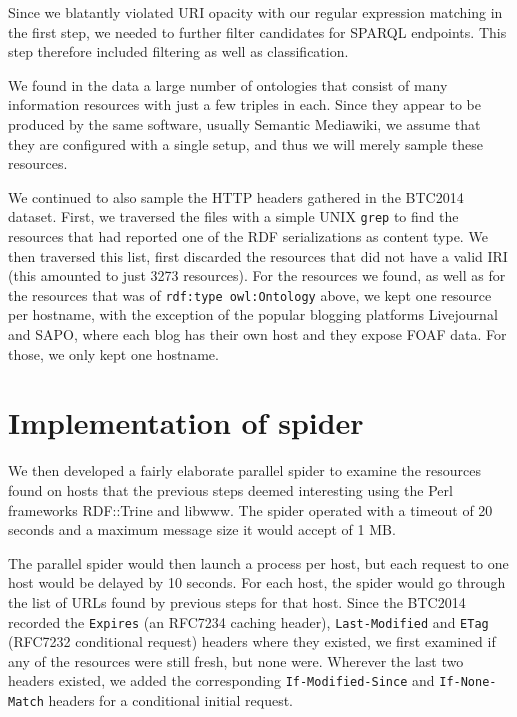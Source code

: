\documentclass{llncs}
\newcommand{\rdfterm}[1]{\texttt{#1}}
\newcommand{\httph}[1]{\texttt{#1}}
\begin{document}
\begin{subappendices}
Since we blatantly violated URI opacity with our regular expression
matching in the first step, we needed to further filter candidates for
SPARQL endpoints. This step therefore included filtering as well as
classification.

We found in the data a large number of ontologies that consist of many
information resources with just a few triples in each. Since they
appear to be produced by the same software, usually Semantic
Mediawiki, we assume that they are configured with a single setup, and
thus we will merely sample these resources.

We continued to also sample the HTTP headers gathered in the BTC2014
dataset. 
First, we traversed the files with a simple UNIX \texttt{grep} to find
the resources that had reported one of the RDF serializations as
content type. We then traversed this list, first discarded the
resources that did not have a valid IRI (this amounted to just 3273
resources). For the resources we found, as well as for the resources
that was of \rdfterm{rdf:type owl:Ontology} above, we kept one
resource per hostname, with the exception of the popular blogging
platforms Livejournal and SAPO, where each blog has their own host and
they expose FOAF data. For those, we only kept one hostname. 

\section{Implementation of spider}\label{app:fetcher}

We then developed a fairly elaborate parallel spider to examine the
resources found on hosts that the previous steps deemed interesting
using the Perl frameworks RDF::Trine and libwww. The spider operated
with a timeout of 20 seconds and a maximum message size it would
accept of 1 MB.

The parallel spider would then launch a process per host, but each
request to one host would be delayed by 10 seconds. For each host, the
spider would go through the list of URLs found by previous steps for
that host. Since the BTC2014 recorded
the \httph{Expires} (an RFC7234 caching header), \httph{Last-Modified}
and \httph{ETag} (RFC7232 conditional request) headers where they
existed, we first examined if any of the resources were still fresh,
but none were. Wherever the last two headers existed, we added the
corresponding \httph{If-Modified-Since} and \httph{If-None-Match}
headers for a conditional initial request.


\end{subappendices}
\end{document}
